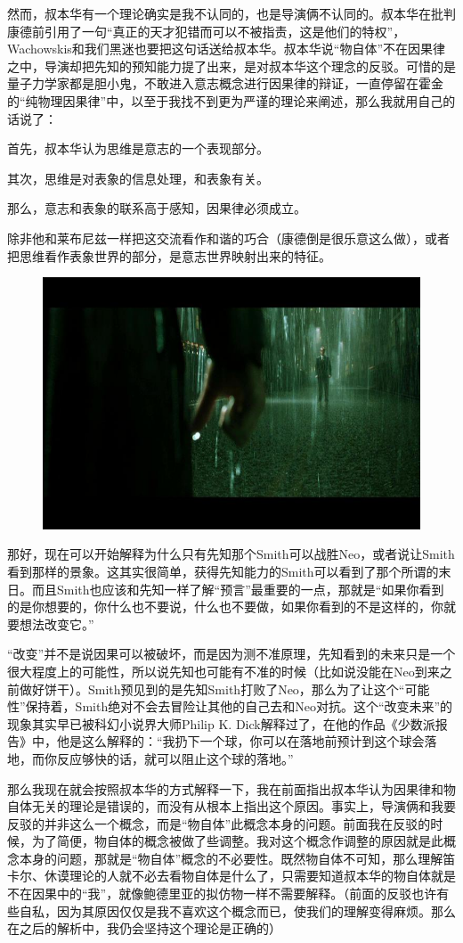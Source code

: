 \documentclass[UTF8]{ctexart}
\begin{document}
然而，叔本华有一个理论确实是我不认同的，也是导演俩不认同的。叔本华在批判康德前引用了一句“真正的天才犯错而可以不被指责，这是他们的特权”，Wachowskis和我们黑迷也要把这句话送给叔本华。叔本华说“物自体”不在因果律之中，导演却把先知的预知能力提了出来，是对叔本华这个理念的反驳。可惜的是量子力学家都是胆小鬼，不敢进入意志概念进行因果律的辩证，一直停留在霍金的“纯物理因果律”中，以至于我找不到更为严谨的理论来阐述，那么我就用自己的话说了：

首先，叔本华认为思维是意志的一个表现部分。

其次，思维是对表象的信息处理，和表象有关。

那么，意志和表象的联系高于感知，因果律必须成立。

除非他和莱布尼兹一样把这交流看作和谐的巧合（康德倒是很乐意这么做），或者把思维看作表象世界的部分，是意志世界映射出来的特征。

\begin{figure}[htb]
\centering
\includegraphics[width=0.5\linewidth]{fig/bbbfa2ccb58aa91101e928d3.jpg}
\end{figure}

那好，现在可以开始解释为什么只有先知那个Smith可以战胜Neo，或者说让Smith看到那样的景象。这其实很简单，获得先知能力的Smith可以看到了那个所谓的末日。而且Smith也应该和先知一样了解“预言”最重要的一点，那就是“如果你看到的是你想要的，你什么也不要说，什么也不要做，如果你看到的不是这样的，你就要想法改变它。”

“改变”并不是说因果可以被破坏，而是因为测不准原理，先知看到的未来只是一个很大程度上的可能性，所以说先知也可能有不准的时候（比如说没能在Neo到来之前做好饼干）。Smith预见到的是先知Smith打败了Neo，那么为了让这个“可能性”保持着，Smith绝对不会去冒险让其他的自己去和Neo对抗。这个“改变未来”的现象其实早已被科幻小说界大师Philip K. Dick解释过了，在他的作品《少数派报告》中，他是这么解释的：“我扔下一个球，你可以在落地前预计到这个球会落地，而你反应够快的话，就可以阻止这个球的落地。”

那么我现在就会按照叔本华的方式解释一下，我在前面指出叔本华认为因果律和物自体无关的理论是错误的，而没有从根本上指出这个原因。事实上，导演俩和我要反驳的并非这么一个概念，而是“物自体”此概念本身的问题。前面我在反驳的时候，为了简便，物自体的概念被做了些调整。我对这个概念作调整的原因就是此概念本身的问题，那就是“物自体”概念的不必要性。既然物自体不可知，那么理解笛卡尔、休谟理论的人就不必去看物自体是什么了，只需要知道叔本华的物自体就是不在因果中的“我”，就像鲍德里亚的拟仿物一样不需要解释。（前面的反驳也许有些自私，因为其原因仅仅是我不喜欢这个概念而已，使我们的理解变得麻烦。那么在之后的解析中，我仍会坚持这个理论是正确的）
\end{document}
